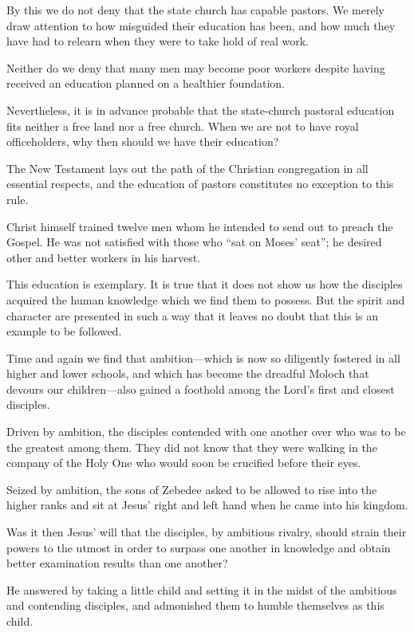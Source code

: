 By this we do not deny that the state church has capable pastors. We merely draw attention to how misguided their education has been, and how much they have had to relearn when they were to take hold of real work.

Neither do we deny that many men may become poor workers despite having received an education planned on a healthier foundation.

Nevertheless, it is in advance probable that the state-church pastoral education fits neither a free land nor a free church. When we are not to have royal officeholders, why then should we have their education?


The New Testament lays out the path of the Christian congregation in all essential respects, and the education of pastors constitutes no exception to this rule.

Christ himself trained twelve men whom he intended to send out to preach the Gospel. He was not satisfied with those who “sat on Moses’ seat”; he desired other and better workers in his harvest.

This education is exemplary. It is true that it does not show us how the disciples acquired the human knowledge which we find them to possess. But the spirit and character are presented in such a way that it leaves no doubt that this is an example to be followed.

Time and again we find that ambition—which is now so diligently fostered in all higher and lower schools, and which has become the dreadful Moloch that devours our children—also gained a foothold among the Lord’s first and closest disciples.

Driven by ambition, the disciples contended with one another over who was to be the greatest among them. They did not know that they were walking in the company of the Holy One who would soon be crucified before their eyes.

Seized by ambition, the sons of Zebedee asked to be allowed to rise into the higher ranks and sit at Jesus’ right and left hand when he came into his kingdom.

Was it then Jesus’ will that the disciples, by ambitious rivalry, should strain their powers to the utmost in order to surpass one another in knowledge and obtain better examination results than one another?

He answered by taking a little child and setting it in the midst of the ambitious and contending disciples, and admonished them to humble themselves as this child.

